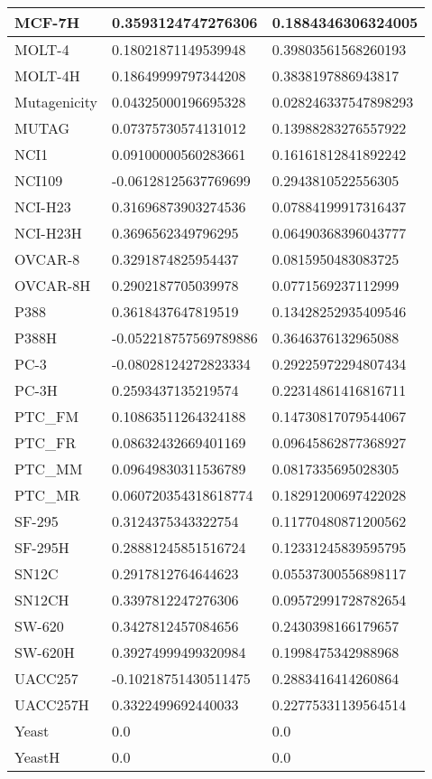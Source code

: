 \documentclass{article}
\begin{document}
\begin{table}[!ht]
\begin{tabular}{|l|l|l|}
        MCF-7H & 0.3593124747276306 & 0.1884346306324005 \\ \hline
        MOLT-4 & 0.18021871149539948 & 0.39803561568260193 \\ \hline
        MOLT-4H & 0.18649999797344208 & 0.3838197886943817 \\ \hline
        Mutagenicity & 0.04325000196695328 & 0.028246337547898293 \\ \hline
        MUTAG & 0.07375730574131012 & 0.13988283276557922 \\ \hline
        NCI1 & 0.09100000560283661 & 0.16161812841892242 \\ \hline
        NCI109 & -0.06128125637769699 & 0.2943810522556305 \\ \hline
        NCI-H23 & 0.31696873903274536 & 0.07884199917316437 \\ \hline
        NCI-H23H & 0.3696562349796295 & 0.06490368396043777 \\ \hline
        OVCAR-8 & 0.3291874825954437 & 0.0815950483083725 \\ \hline
        OVCAR-8H & 0.2902187705039978 & 0.0771569237112999 \\ \hline
        P388 & 0.3618437647819519 & 0.13428252935409546 \\ \hline
        P388H & -0.052218757569789886 & 0.3646376132965088 \\ \hline
        PC-3 & -0.08028124272823334 & 0.29225972294807434 \\ \hline
        PC-3H & 0.2593437135219574 & 0.22314861416816711 \\ \hline
        PTC\_FM & 0.10863511264324188 & 0.14730817079544067 \\ \hline
        PTC\_FR & 0.08632432669401169 & 0.09645862877368927 \\ \hline
        PTC\_MM & 0.09649830311536789 & 0.0817335695028305 \\ \hline
        PTC\_MR & 0.060720354318618774 & 0.18291200697422028 \\ \hline
        SF-295 & 0.3124375343322754 & 0.11770480871200562 \\ \hline
        SF-295H & 0.28881245851516724 & 0.12331245839595795 \\ \hline
        SN12C & 0.2917812764644623 & 0.05537300556898117 \\ \hline
        SN12CH & 0.3397812247276306 & 0.09572991728782654 \\ \hline
        SW-620 & 0.3427812457084656 & 0.2430398166179657 \\ \hline
        SW-620H & 0.39274999499320984 & 0.1998475342988968 \\ \hline
        UACC257 & -0.10218751430511475 & 0.2883416414260864 \\ \hline
        UACC257H & 0.3322499692440033 & 0.22775331139564514 \\ \hline
        Yeast & 0.0 & 0.0 \\ \hline
        YeastH & 0.0 & 0.0 \\ \hline
    \end{tabular}
\end{table}
\end{document}
